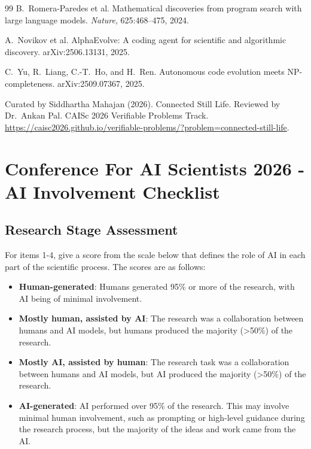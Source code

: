 \documentclass{article}
\begin{document}
\begin{thebibliography}{99}
B.~Romera-Paredes et al.
Mathematical discoveries from program search with large language models.
\emph{Nature}, 625:468--475, 2024.

A.~Novikov et al.
AlphaEvolve: A coding agent for scientific and algorithmic discovery.
arXiv:2506.13131, 2025.

C.~Yu, R.~Liang, C.-T.~Ho, and H.~Ren.
Autonomous code evolution meets NP-completeness.
arXiv:2509.07367, 2025.

Curated by Siddhartha Mahajan (2026).
Connected Still Life.
Reviewed by Dr.\ Ankan Pal.
CAISc 2026 Verifiable Problems Track.
\url{https://caisc2026.github.io/verifiable-problems/?problem=connected-still-life}.

\end{thebibliography}

\newpage

\section*{Conference For AI Scientists 2026 - AI Involvement Checklist}
\label{checklist_ai_involvement}


\subsection*{Research Stage Assessment}

For items 1-4, give a score from the scale below that defines the role of AI in each part of the scientific process. The scores are as follows:

\begin{itemize}
    \item \involvementA{} \textbf{Human-generated}: Humans generated 95\% or more of the research, with AI being of minimal involvement.
    \item \involvementB{} \textbf{Mostly human, assisted by AI}: The research was a collaboration between humans and AI models, but humans produced the majority (>50\%) of the research.
    \item \involvementC{} \textbf{Mostly AI, assisted by human}: The research task was a collaboration between humans and AI models, but AI produced the majority (>50\%) of the research.
    \item \involvementD{} \textbf{AI-generated}: AI performed over 95\% of the research. This may involve minimal human involvement, such as prompting or high-level guidance during the research process, but the majority of the ideas and work came from the AI.
\end{itemize}
\end{document}
